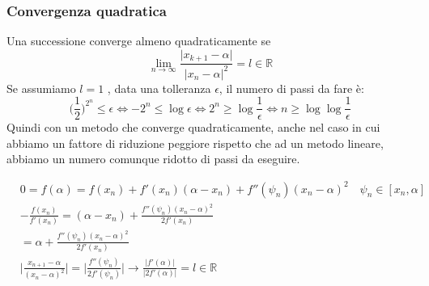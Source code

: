 \subsubsection{Convergenza quadratica}
Una successione converge almeno quadraticamente se
\begin{equation*}
	\lim_{n \to \infty} \frac{\lvert x_{k+1}-\alpha \rvert}{\lvert x_{n}-\alpha \rvert ^2} = l \in \mathbb{R}
\end{equation*}
Se assumiamo $l=1$ , data una tolleranza $\epsilon$, il numero di passi da fare è:
\begin{equation*}
	\bigg(\frac{1}{2}\bigg)^{2^n} \leq \epsilon \Leftrightarrow -2^n \leq \log \epsilon \Leftrightarrow 2^n \geq \log \frac{1}{\epsilon} \Leftrightarrow n \geq \log \log \frac{1}{\epsilon}
\end{equation*}
Quindi con un metodo che converge quadraticamente, anche nel caso in cui abbiamo un fattore di riduzione peggiore rispetto che ad un metodo lineare, abbiamo un numero comunque ridotto di passi da eseguire. 
\begin{demostration}
	\begin{align*}
		& 0=f(\alpha)=f(x_n)+f'(x_n)(\alpha-x_n)+f''(\psi_n)(x_n-\alpha)^2 \quad \psi_n \in [x_n,\alpha] \\
		& -\frac{f(x_n)}{f'(x_n)} = (\alpha - x_n) + \frac{f''(\psi_n)(x_n-\alpha)^2}{2f'(x_n)} \\
		& = \alpha + \frac{f''(\psi_n)(x_n-\alpha)^2}{2f'(x_n)} \\
		& \bigg\lvert \frac{x_{n+1}-\alpha}{(x_n-\alpha)^2}\bigg\rvert = \bigg\lvert \frac{f''(\psi_n)}{2f'(\psi_n)}\bigg\rvert \to \frac{\lvert f'(\alpha)\rvert}{\lvert 2 f'(\alpha)\rvert}=l\in \mathbb{R}
	\end{align*}
\end{demostration}

